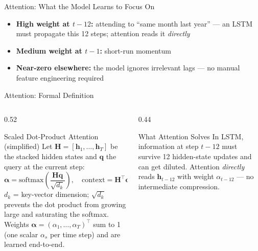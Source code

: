 \documentclass[aspectratio=169, 10pt]{beamer}
\begin{document}
\begin{frame}{Attention: What the Model Learns to Focus On}
  \begin{itemize}\footnotesize
    \item \textbf{High weight at $t-12$:} attending to ``same month last year'' ---
          an LSTM must propagate this 12 steps; attention reads it \emph{directly}
    \item \textbf{Medium weight at $t-1$:} short-run momentum
    \item \textbf{Near-zero elsewhere:} the model ignores irrelevant lags ---
          no manual feature engineering required
  \end{itemize}
\end{frame}

\begin{frame}{Attention: Formal Definition}
  \begin{columns}[T]
    \begin{column}{0.52\textwidth}
      \begin{definitionbox}{Scaled Dot-Product Attention (simplified)}
        \footnotesize
        Let $\mathbf{H} = [\mathbf{h}_1, \ldots, \mathbf{h}_T]$ be the stacked
        hidden states and $\mathbf{q}$ the query at the current step:
        \[
          \boldsymbol{\alpha}
          = \mathrm{softmax}\!\left(
              \frac{\mathbf{H}\mathbf{q}}{\sqrt{d_k}}
            \right),
          \quad
          \mathrm{context} = \mathbf{H}^\top \boldsymbol{\alpha}
        \]
        $d_k$ = key-vector dimension; $\sqrt{d_k}$ prevents the dot product
        from growing large and saturating the softmax.
        Weights $\boldsymbol{\alpha} = (\alpha_1,\ldots,\alpha_T)^\top$ sum to 1
        (one scalar $\alpha_s$ per time step) and are learned end-to-end.
      \end{definitionbox}

      \smallskip

      \vspace{3pt}
    \end{column}
    \begin{column}{0.44\textwidth}
      \begin{examplebox}{What Attention Solves}
        \footnotesize
        In LSTM, information at step $t-12$ must survive 12 hidden-state
        updates and can get diluted. Attention \emph{directly} reads
        $\mathbf{h}_{t-12}$ with weight $\alpha_{t-12}$ ---
        no intermediate compression.
      \end{examplebox}
    \end{column}
  \end{columns}
\end{frame}
\end{document}
